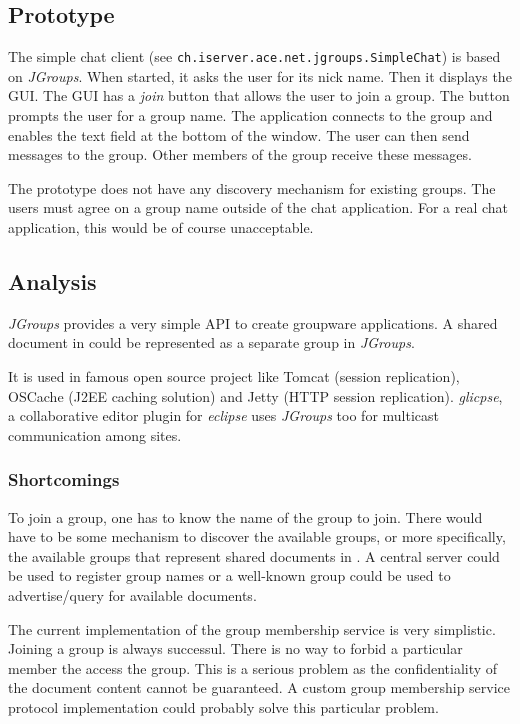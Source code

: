 \subsection{Prototype}
The simple chat client (see \texttt{ch.iserver.ace.net.jgroups.SimpleChat}) is based on \emph{JGroups}. When started, it asks the user for its nick name. Then it displays the GUI. The GUI has a \emph{join} button that allows the user to join a group. The button prompts the user for a group name. The application connects to the group and enables the text field at the bottom of the window. The user can then send messages to the group. Other members of the group receive these messages.

The prototype does not have any discovery mechanism for existing groups. The users must agree on a group name outside of the chat application. For a real chat application, this would be of course unacceptable.


\subsection{Analysis}
\emph{JGroups} provides a very simple API to create groupware applications. A shared document in \ace could be represented as a separate group in \emph{JGroups}. 

It is used in famous open source project like Tomcat (session replication), OSCache (J2EE caching solution) and Jetty (HTTP session replication). \emph{glicpse}, a collaborative editor plugin for \emph{eclipse} uses \emph{JGroups} too for multicast communication among sites.

\subsubsection{Shortcomings}
To join a group, one has to know the name of the group to join. There would have to be some mechanism to discover the available groups, or more specifically, the available groups that represent shared documents in \ace. A central server could be used to register group names or a well-known group could be used to advertise/query for available documents.

The current implementation of the group membership service is very simplistic. Joining a group is always successul. There is no way to forbid a particular member the access the group. This is a serious problem as the confidentiality of the document content cannot be guaranteed. A custom group membership service protocol implementation could probably solve this particular problem.

